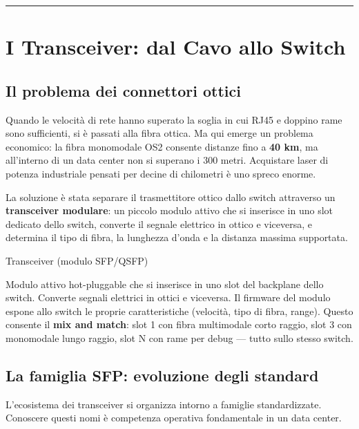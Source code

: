 \documentclass[
  italian,
  openany]{book}
\begin{document}
\begin{center}\rule{0.5\linewidth}{0.5pt}\end{center}

\section{I Transceiver: dal Cavo allo
Switch}\label{i-transceiver-dal-cavo-allo-switch}

\subsection{Il problema dei connettori
ottici}\label{il-problema-dei-connettori-ottici}

Quando le velocità di rete hanno superato la soglia in cui RJ45 e
doppino rame sono sufficienti, si è passati alla fibra ottica. Ma qui
emerge un problema economico: la fibra monomodale OS2 consente distanze
fino a \textbf{40 km}, ma all'interno di un data center non si superano
i 300 metri. Acquistare laser di potenza industriale pensati per decine
di chilometri è uno spreco enorme.

La soluzione è stata separare il trasmettitore ottico dallo switch
attraverso un \textbf{transceiver modulare}: un piccolo modulo attivo
che si inserisce in uno slot dedicato dello switch, converte il segnale
elettrico in ottico e viceversa, e determina il tipo di fibra, la
lunghezza d'onda e la distanza massima supportata.

\begin{calloutdefinition}{Transceiver (modulo SFP/QSFP)}

Modulo attivo hot-pluggable che si inserisce in uno slot del backplane
dello switch. Converte segnali elettrici in ottici e viceversa. Il
firmware del modulo espone allo switch le proprie caratteristiche
(velocità, tipo di fibra, range). Questo consente il \textbf{mix and
match}: slot 1 con fibra multimodale corto raggio, slot 3 con monomodale
lungo raggio, slot N con rame per debug --- tutto sullo stesso switch.

\end{calloutdefinition}

\subsection{La famiglia SFP: evoluzione degli
standard}\label{la-famiglia-sfp-evoluzione-degli-standard}

L'ecosistema dei transceiver si organizza intorno a famiglie
standardizzate. Conoscere questi nomi è competenza operativa
fondamentale in un data center.
\end{document}
